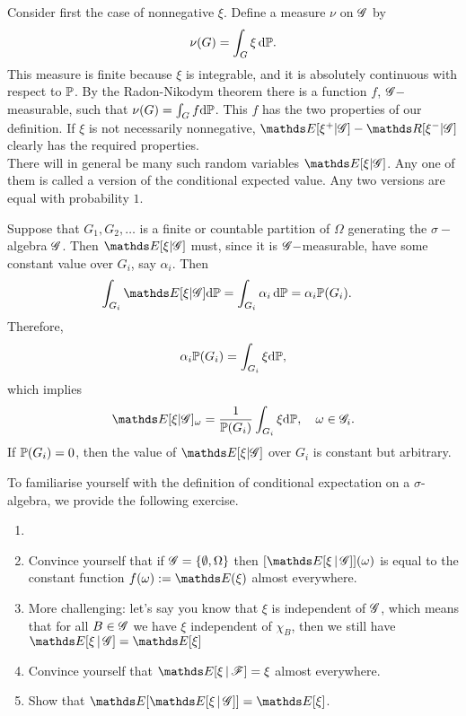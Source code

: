Consider first the case of nonnegative $\xi$. Define a measure $\nu$ on $\mathcal{G}$ by
\begin{equation*}
    \nu(G) = \int_G \xi \, \mathrm{d} \mathbb{P}.
\end{equation*}
This measure is finite because $\xi$ is integrable, and it is absolutely continuous with respect to $\mathbb{P}$. By the Radon-Nikodym theorem there is a function $f$, $\mathcal{G}-$measurable, such that $\nu(G) = \int_G f \mathrm{d} \mathbb{P}$. This $f$ has the two properties of our definition. If $\xi$ is not necessarily nonnegative, $\E[\xi^+ | \G] - \R[\xi^- | \G]$ clearly has the required properties. \\

There will in general be many such random variables $\E[\xi | \G]$. Any one of them is called a version of the conditional expected value. Any two versions are equal with probability $1$.

\begin{example}
Suppose that $G_1, G_2, \dots$ is a finite or countable partition of $\Omega$ generating the $\sigma-$algebra $\mathcal{G}$. Then $\E[\xi | \G]$ must, since it is $\mathcal{G}-$measurable, have some constant value over $G_i$, say $\alpha_i$. Then
\begin{align}
    \int_{G_i} \E[\xi | \G] \d \p &= \int_{G_i} \alpha_i \, \d \p = \alpha_i \p(G_i).
\end{align}
Therefore,
\begin{equation}
    \alpha_i \mathbb{P} (G_i) = \int_{G_i} \xi \mathrm{d} \mathbb{P},
\end{equation}
which implies
\begin{equation}
    \E[\xi | \G]_\omega = \frac{1}{\p(G_i)} \int_{G_i} \xi \d \p, \quad \omega \in \G_i.
\end{equation}
If $\mathbb{P}(G_i) = 0$, then the value of $\E[\xi | \G]$ over $G_i$ is constant but arbitrary.
\end{example}

To familiarise yourself with the definition of conditional expectation on a $\sigma$-algebra, we provide the following exercise.
\begin{exercise} \label{ex:tower_property}
\begin{enumerate}
    \item[]
    \item Convince yourself that if $\mathcal{G} = \left\{ \emptyset, \Omega \right \}$ then $[\E[\xi\,|\,\G]](\omega)$ is equal to the constant function $f(\omega) := \E(\xi)$ almost everywhere.
    \item More challenging: let's say you know that $\xi$ is independent of $\mathcal{G}$, which means that for all $B \in \mathcal{G}$ we have $\xi$ independent of $\chi_B$, then we still have $\E[\xi\,|\,\G] = \E[\xi]$
    \item Convince yourself that $\E[\xi \,|\, \F] = \xi$ almost everywhere.
    \item Show that $\E[\E[\xi \,|\, \G]] = \E[\xi]$.
\end{enumerate}
\end{exercise}

